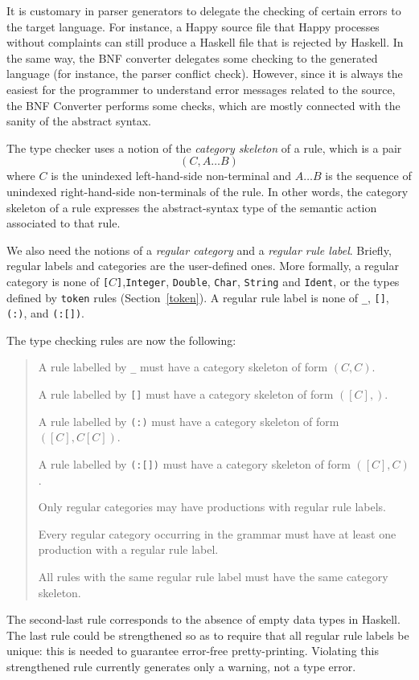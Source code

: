 \documentclass[10pt]{article}
\newcommand{\bequ}{\begin{quote}}
\newcommand{\enqu}{\end{quote}}
\begin{document}
\label{typecheck}

It is customary in parser generators to delegate the checking of certain
errors to the target language. For instance, a Happy source file that
Happy processes without complaints can still produce a Haskell file
that is rejected by Haskell. In the same way, the BNF converter
delegates some checking to the generated language (for instance,
the parser conflict check). However, since it is always
the easiest for the programmer to understand error messages
related to the source, the BNF Converter performs some checks,
which are mostly connected with the sanity of the abstract syntax.

The type checker uses a notion of the
\textit{category skeleton} of a rule, which is a pair
\[
  (C, A\ldots B)
\]
where $C$ is the unindexed left-hand-side non-terminal and $A\ldots B$
is the sequence of unindexed right-hand-side non-terminals of the rule.
In other words, the category skeleton of a rule expresses the abstract-syntax
type of the semantic action associated to that rule.

We also need the notions of
a \textit{regular category} and
a \textit{regular rule label}.
Briefly, regular labels and categories are the user-defined ones.
More formally,
a regular category is none of
{\tt[}$C${\tt]},{\tt Integer}, {\tt Double}, {\tt Char}, {\tt String}
and {\tt Ident}, or the types defined by {\tt token} rules (Section~\ref{token}).
A regular rule label is none of
{\tt \_}, {\tt []}, {\tt (:)}, and {\tt (:[])}.

The type checking rules are now the following:
\bequ
A rule labelled by {\tt \_} must have a category skeleton of form $(C,C)$.

A rule labelled by {\tt []} must have a category skeleton of form $([C],)$.

A rule labelled by {\tt (:)} must have a category skeleton of form $([C],C[C])$.

A rule labelled by {\tt (:[])} must have a category skeleton of form $([C],C)$.

Only regular categories may have productions with regular rule labels.

Every regular category occurring in the grammar
must have at least one production with a regular rule label.

All rules with the same regular rule label must have the same
category skeleton.
\enqu
The second-last rule corresponds to the absence of empty data types in Haskell.
The last rule could
be strengthened so as to require that all regular rule labels be unique:
this is needed to guarantee error-free pretty-printing.
Violating this strengthened rule currently
generates only a warning, not a type error.
\end{document}
